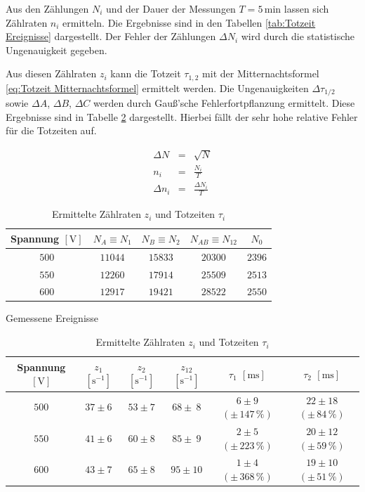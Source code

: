 \documentclass[12pt,a4paper]{scrartcl}
\numberwithin{equation}{section} %
\renewcommand{\[}{} %
\renewcommand{\]}{\noindent} %
\begin{document}
Aus den Zählungen $N_i$ und der Dauer der Messungen $T=5\mathrm{\,min}$ lassen sich Zählraten $n_i$ ermitteln. Die Ergebnisse sind in den Tabellen \ref{tab:Totzeit Ereignisse} dargestellt. Der Fehler der Zählungen $\Delta N_i$ wird durch die statistische Ungenauigkeit gegeben.

Aus diesen Zählraten $z_i$ kann die Totzeit $\tau_{1,2}$ mit der Mitternachtsformel \eqref{eq:Totzeit Mitternachtsformel} ermittelt werden. Die Ungenauigkeiten  $\Delta \tau_{1/2}$ sowie $\Delta A$, $\Delta B$, $\Delta C$ werden durch Gauß'sche Fehlerfortpflanzung ermittelt. Diese Ergebnisse sind in Tabelle \ref{tab:Totzeiten} dargestellt. Hierbei fällt der sehr hohe relative Fehler für die Totzeiten auf.

\begin{eqnarray}
	\Delta N &=& \sqrt{N} \\
	n_i &=& \frac{N_i}{T} \\
	\Delta n_i &=& \frac{\Delta N_i}{T}
\end{eqnarray}

\begin{table}[h!]
	\centering
	\begin{tabular}[h]{c|c|c|c|c}
		Spannung $[\mathrm V]$
			& $N_A\equiv N_1$
			& $N_B\equiv N_2$
			& $N_{AB}\equiv N_{12}$
			& $N_0$ \\
		\hline
		$500$ & $11044$ & $15833$ & $20300$ & $2396$ \\
		$550$ & $12260$ & $17914$ & $25509$ & $2513$ \\
		$600$ & $12917$ & $19421$ & $28522$ & $2550$ \\
	\end{tabular}
	\caption{Gemessene Ereignisse}
	\label{tab:Totzeit Ereignisse}
	\vspace{12pt}

	\begin{tabular}[h]{c|c|c|c|c|c}
		Spannung $[\mathrm V]$
			& $z_1$ $[\mathrm s^{-1}]$
			& $z_2$ $[\mathrm s^{-1}]$
			& $z_{12}$ $[\mathrm s^{-1}]$
			& $\tau_1$ $[\mathrm{ms}]$
			& $\tau_2$ $[\mathrm{ms}]$ \\
		\hline
		$500$
			& $37 \pm 6$
			& $53 \pm 7$
			& $68 \pm \ 8$
			& $6 \pm 9$ $(\pm\, 147\,\%)$
			& $22 \pm 18$ $(\pm\, 84\,\%)$ \\
		$550$
			& $41 \pm 6$
			& $60 \pm 8$
			& $85 \pm \ 9$
			 & $2 \pm 5$ $(\pm\, 223\,\%)$
			 & $20 \pm 12$ $(\pm\, 59\,\%)$ \\
		$600$
			& $43 \pm 7$
			& $65 \pm 8$
			& $95 \pm 10$
			& $1 \pm 4$ $(\pm\, 368\,\%)$
			& $19 \pm 10$ $(\pm\, 51\,\%)$ \\
	\end{tabular}
	\caption{Ermittelte Zählraten $z_i$ und Totzeiten $\tau_i$}
	\label{tab:Totzeiten}
\end{table}
\end{document}
